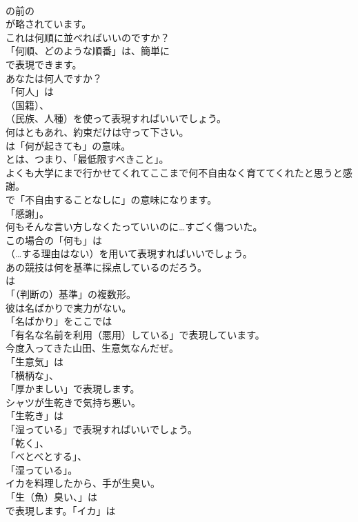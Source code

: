 \documentclass[8pt]{extreport}
\begin{document}
\begin{CJK}{UTF8}{min}
\\	の前の 
\\	が略されています。	
\\	これは何順に並べればいいのですか？ 
\\	「何順、どのような順番」は、簡単に
\\	で表現できます。	
\\	あなたは何人ですか？ 
\\	「何人」は 
\\	（国籍）、
\\	（民族、人種）を使って表現すればいいでしょう。	
\\	何はともあれ、約束だけは守って下さい。 
\\	は「何が起きても」の意味。
\\	とは、つまり、「最低限すべきこと」。	
\\	よくも大学にまで行かせてくれてここまで何不自由なく育ててくれたと思うと感謝。 
\\	で「不自由することなしに」の意味になります。
\\	「感謝」。	
\\	何もそんな言い方しなくたっていいのに…すごく傷ついた。 
\\	この場合の「何も」は 
\\	（…する理由はない）を用いて表現すればいいでしょう。	
\\	あの競技は何を基準に採点しているのだろう。 
\\	は
\\	「（判断の）基準」の複数形。	
\\	彼は名ばかりで実力がない。 
\\	「名ばかり」をここでは
\\	「有名な名前を利用（悪用）している」で表現しています。	
\\	今度入ってきた山田、生意気なんだぜ。 
\\	「生意気」は
\\	「横柄な」、
\\	「厚かましい」で表現します。	
\\	シャツが生乾きで気持ち悪い。 
\\	「生乾き」は
\\	「湿っている」で表現すればいいでしょう。
\\	「乾く」、
\\	「べとべとする」、
\\	「湿っている」。	
\\	イカを料理したから、手が生臭い。 
\\	「生（魚）臭い、」は
\\	で表現します。「イカ」は

\end{CJK}
\end{document}
